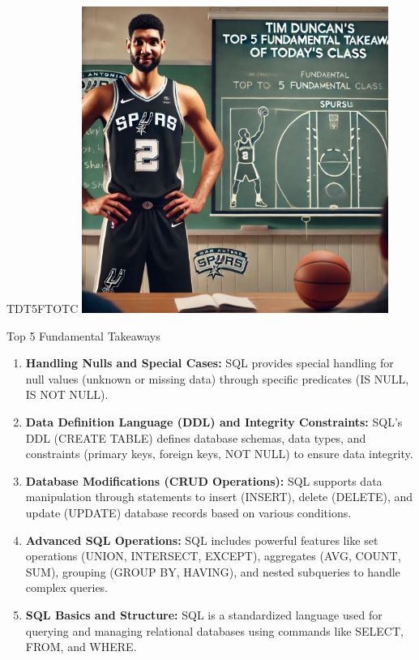 \documentclass{beamer}
\begin{document}
\begin{frame}{TDT5FTOTC}
    \centering
    \includegraphics[width=0.75\textwidth]{figures/tim.png}
\end{frame}

\begin{frame}{Top 5 Fundamental Takeaways}
    \small
    \begin{enumerate} \pause
        \item[5] \textbf{Handling Nulls and Special Cases:} SQL provides special handling for null values (unknown or missing data) through specific predicates (IS NULL, IS NOT NULL). \pause
        \item[4] \textbf{Data Definition Language (DDL) and Integrity Constraints:} SQL's DDL (CREATE TABLE) defines database schemas, data types, and constraints (primary keys, foreign keys, NOT NULL) to ensure data integrity. \pause
        \item[3] \textbf{Database Modifications (CRUD Operations):} SQL supports data manipulation through statements to insert (INSERT), delete (DELETE), and update (UPDATE) database records based on various conditions. \pause
        \item[2] \textbf{Advanced SQL Operations:} SQL includes powerful features like set operations (UNION, INTERSECT, EXCEPT), aggregates (AVG, COUNT, SUM), grouping (GROUP BY, HAVING), and nested subqueries to handle complex queries. \pause
        \item[1] \textbf{SQL Basics and Structure:} SQL is a standardized language used for querying and managing relational databases using commands like SELECT, FROM, and WHERE.
    \end{enumerate}
\end{frame}
\end{document}
